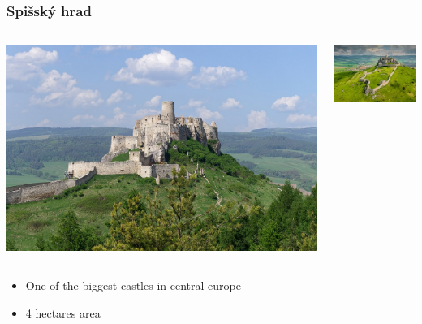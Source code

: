 \documentclass{beamer}
\begin{document}
	\begin{frame}
		\frametitle{Spišský hrad}

		\begin{columns}
			\begin{column}{.5\textwidth}
				\includegraphics[width=\textwidth]{day2/hrad}
			\end{column}
			\begin{column}{.5\textwidth}
				\includegraphics[width=\textwidth]{day2/hrad-topdown}
			\end{column}
		\end{columns}

		\pause

		\vspace{1em}
		\begin{itemize}
			\item One of the biggest castles in central europe
			\item 4 hectares area
		\end{itemize}
	\end{frame}
\end{document}
